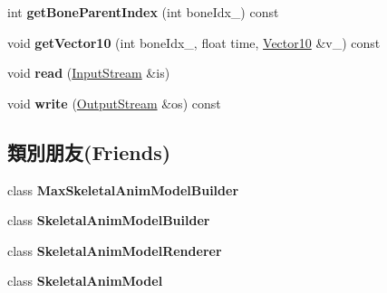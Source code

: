 \begin{DoxyCompactItemize}
\item 
int {\bfseries get\+Bone\+Parent\+Index} (int bone\+Idx\+\_\+) const \hypertarget{class_magnum_1_1_skeletal_anim_model_1_1_animation_a22203b5aa712e284bc86ab1b3cc842dc}{}\label{class_magnum_1_1_skeletal_anim_model_1_1_animation_a22203b5aa712e284bc86ab1b3cc842dc}

\item 
void {\bfseries get\+Vector10} (int bone\+Idx\+\_\+, float time, \hyperlink{class_magnum_1_1_vector10}{Vector10} \&v\+\_\+) const \hypertarget{class_magnum_1_1_skeletal_anim_model_1_1_animation_a7cd99a64981b996ad4ab4c543e4b3cd8}{}\label{class_magnum_1_1_skeletal_anim_model_1_1_animation_a7cd99a64981b996ad4ab4c543e4b3cd8}

\item 
void {\bfseries read} (\hyperlink{class_magnum_1_1_input_stream}{Input\+Stream} \&is)\hypertarget{class_magnum_1_1_skeletal_anim_model_1_1_animation_a53fbe72e919e18d92354188b4850502d}{}\label{class_magnum_1_1_skeletal_anim_model_1_1_animation_a53fbe72e919e18d92354188b4850502d}

\item 
void {\bfseries write} (\hyperlink{class_magnum_1_1_output_stream}{Output\+Stream} \&os) const \hypertarget{class_magnum_1_1_skeletal_anim_model_1_1_animation_ab1e03e581af5bf1db659c9d74fc03eda}{}\label{class_magnum_1_1_skeletal_anim_model_1_1_animation_ab1e03e581af5bf1db659c9d74fc03eda}

\end{DoxyCompactItemize}
\subsection*{類別朋友(Friends)}
\begin{DoxyCompactItemize}
\item 
class {\bfseries Max\+Skeletal\+Anim\+Model\+Builder}\hypertarget{class_magnum_1_1_skeletal_anim_model_1_1_animation_a68b08defd5651552ef2b6f922eee7ff9}{}\label{class_magnum_1_1_skeletal_anim_model_1_1_animation_a68b08defd5651552ef2b6f922eee7ff9}

\item 
class {\bfseries Skeletal\+Anim\+Model\+Builder}\hypertarget{class_magnum_1_1_skeletal_anim_model_1_1_animation_a31d58261bc4fbf7a6c1d2d2547437974}{}\label{class_magnum_1_1_skeletal_anim_model_1_1_animation_a31d58261bc4fbf7a6c1d2d2547437974}

\item 
class {\bfseries Skeletal\+Anim\+Model\+Renderer}\hypertarget{class_magnum_1_1_skeletal_anim_model_1_1_animation_ae50fe2cd824b9de98af4dd4aa51d4935}{}\label{class_magnum_1_1_skeletal_anim_model_1_1_animation_ae50fe2cd824b9de98af4dd4aa51d4935}

\item 
class {\bfseries Skeletal\+Anim\+Model}\hypertarget{class_magnum_1_1_skeletal_anim_model_1_1_animation_a88c72f2f6b125ba518843b71080035e5}{}\label{class_magnum_1_1_skeletal_anim_model_1_1_animation_a88c72f2f6b125ba518843b71080035e5}

\end{DoxyCompactItemize}


